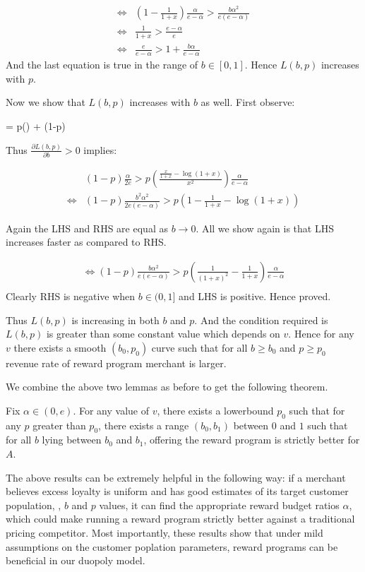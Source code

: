 \begin{align*}
\Leftrightarrow & \left(1 - \frac{1}{1+x}\right) \frac{\alpha}{e-\alpha} > \frac{b\alpha^2}{e(e-\alpha)}\\
\Leftrightarrow & \frac{1}{1+x} > \frac{e-\alpha}{e}\\
\Leftrightarrow & \frac{e}{e-\alpha} > 1 + \frac{b\alpha}{e-\alpha}
\end{align*}
And the last equation is true in the range of $b\in [0,1]$. Hence $L(b,p)$ increases with $p$.

Now we show that $L(b,p)$ increases with $b$ as well. First observe:

\beq
{} = p\left(\right) + (1-p)
\notag
\eeq

Thus $\frac{\partial L(b,p)}{\partial b} > 0$ implies:

\begin{align*}
& (1-p)\frac{\alpha}{2e} > p\left(\frac{\frac{x}{1+x} - \log(1+x)}{x^2}\right)\frac{\alpha}{e-\alpha}\\
\Leftrightarrow & (1-p)\frac{b^2\alpha^2}{2e(e-\alpha)} > p \left(1 - \frac{1}{1+x} - \log(1+x)\right)
\end{align*}

Again the LHS and RHS are equal as $b\rightarrow 0$. All we show again is that LHS increases faster as compared to RHS.

\begin{align*}
\Leftrightarrow (1-p)\frac{b\alpha^2}{e(e-\alpha)} > p\left(\frac{1}{(1+x)^2} - \frac{1}{1+x} \right)\frac{\alpha}{e-\alpha}\\
\end{align*}
Clearly RHS is negative when $b\in (0,1]$ and LHS is positive. Hence proved.

Thus $L(b,p)$ is increasing in both $b$ and $p$. And the condition required is $L(b,p)$ is greater than some constant value which depends on $v$.
Hence for any $v$ there exists a smooth $(b_0,p_0)$ curve such that for all $b\ge b_0$ and $p\ge p_0$ revenue rate of reward program merchant is larger.

\endproof

We combine the above two lemmas as before to get the following theorem.

\begin{theorem}
Fix $\alpha \in (0, e)$. 
For any value of $v$, there exists a lowerbound $p_0$ such that for any $p$ greater than $p_0$, there exists a range $(b_0, b_1)$ between $0$ and $1$ such that for all $b$ lying between $b_0$ and $b_1$, offering the reward program is strictly better for $A$. 
\end{theorem}

The above results can be extremely helpful in the following way: if a merchant believes excess loyalty is uniform and has good estimates of its target customer population, \ie, $b$ and $p$ values, it can find the appropriate reward budget ratios $\alpha$, which could make running a reward program strictly better against a traditional pricing competitor. Most importantly, these results show that under mild assumptions on the customer poplation parameters, reward programs can be beneficial in our duopoly model.
